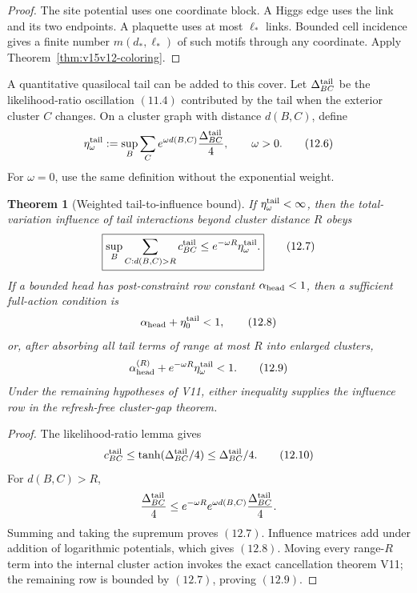 \documentclass[11pt]{article}
\newtheorem{theorem}{Theorem}[section]
\theoremstyle{remark}
\begin{document}
\begin{proof}
The site potential uses one coordinate block.  A Higgs edge uses
the link and its two endpoints.  A plaquette uses at most
\(\ell_*\) links.  Bounded cell incidence gives a finite number
\(m(d_*,\ell_*)\) of such motifs through any coordinate.  Apply
Theorem~\ref{thm:v15v12-coloring}.
\end{proof}

A quantitative quasilocal tail can be added to this cover.  Let
\(\Delta_{BC}^{\rm tail}\) be the likelihood-ratio oscillation
\((11.4)\) contributed by the tail when the exterior cluster
\(C\) changes.  On a cluster graph with distance \(d(B,C)\),
define
\[
 \eta_\omega^{\rm tail}
 :=\sup_B\sum_C
 e^{\omega d(B,C)}
 \frac{\Delta_{BC}^{\rm tail}}4,
 \qquad \omega>0.                                           \tag{12.6}
\]
For \(\omega=0\), use the same definition without the exponential
weight.

\begin{theorem}[Weighted tail-to-influence bound]
\label{thm:v15v12-tail-bound}
If \(\eta_\omega^{\rm tail}<\infty\), then the total-variation
influence of tail interactions beyond cluster distance \(R\)
obeys
\[
 \boxed{
 \sup_B\sum_{C:d(B,C)>R}c_{BC}^{\rm tail}
 \le e^{-\omega R}\eta_\omega^{\rm tail}.}                  \tag{12.7}
\]
If a bounded head has post-constraint row constant
\(\alpha_{\rm head}<1\), then a sufficient full-action condition
is
\[
 \alpha_{\rm head}+\eta_0^{\rm tail}<1,                      \tag{12.8}
\]
or, after absorbing all tail terms of range at most \(R\) into
enlarged clusters,
\[
 \alpha_{\rm head}^{(R)}
 +e^{-\omega R}\eta_\omega^{\rm tail}<1.                    \tag{12.9}
\]
Under the remaining hypotheses of V11, either inequality supplies
the influence row in the refresh-free cluster-gap theorem.
\end{theorem}

\begin{proof}
The likelihood-ratio lemma gives
\[
 c_{BC}^{\rm tail}
 \le\tanh(\Delta_{BC}^{\rm tail}/4)
 \le\Delta_{BC}^{\rm tail}/4.                               \tag{12.10}
\]
For \(d(B,C)>R\),
\[
 \frac{\Delta_{BC}^{\rm tail}}4
 \le e^{-\omega R}
 e^{\omega d(B,C)}
 \frac{\Delta_{BC}^{\rm tail}}4.
\]
Summing and taking the supremum proves \((12.7)\).  Influence
matrices add under addition of logarithmic potentials, which gives
\((12.8)\).  Moving every range-\(R\) term into the internal
cluster action invokes the exact cancellation theorem V11; the
remaining row is bounded by \((12.7)\), proving \((12.9)\).
\end{proof}
\end{document}
